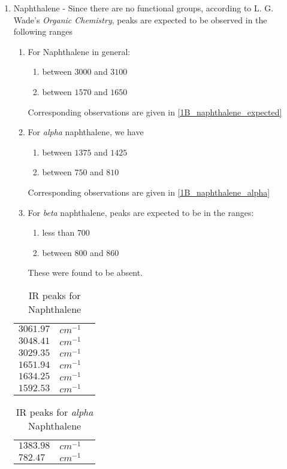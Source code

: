 \begin{enumerate}
		\item Naphthalene - Since there are no functional groups, according to L. G. Wade's \emph{Organic Chemistry}, peaks are expected to be observed in the following ranges
			\begin{enumerate}
				\item 
					For Naphthalene in general:
					\begin{enumerate}
						\item between $3000$ and $3100$ 
						\item between $1570$ and $1650$ \\
					\end{enumerate}			
					Corresponding observations are given in \autoref{1B_naphthalene_expected}
				\item 
					For \emph{alpha}  naphthalene, we have
					\begin{enumerate}
						\item between $1375$ and $1425$
						\item between $750$ and $810$
					\end{enumerate}
					Corresponding observations are given in \autoref{1B_naphthalene_alpha}
				\item
					For \emph{beta} naphthalene, peaks are expected to be in the ranges:
					\begin{enumerate}
						\item less than $700$
						\item between $800$ and $860$
					\end{enumerate}
					These were found to be absent.
			\end{enumerate}

		
			\begin{table}
				\myfloatalign
				\begin{tabularx}{\textwidth}{Xll}
					\hline%
					$3061.97$				& 	$cm^{-1}$\\
					$3048.41$				& 	$cm^{-1}$\\
					$3029.35$				& 	$cm^{-1}$\\
					$1651.94$				& 	$cm^{-1}$\\
					$1634.25$				& 	$cm^{-1}$\\
					$1592.53$				& 	$cm^{-1}$\\
					\hline%
				\end{tabularx}
				\caption{IR peaks for Naphthalene}
				\label{1B_naphthalene_expected}
			\end{table}

			\begin{table}
				\myfloatalign
				\begin{tabularx}{\textwidth}{Xll}
					\hline%
					$1383.98$				& 	$cm^{-1}$\\
					$782.47$				& 	$cm^{-1}$\\
					\hline%
				\end{tabularx}
				\caption{IR peaks for \emph{alpha} Naphthalene}
				\label{1B_naphthalene_alpha}
			\end{table}


	\end{enumerate}

